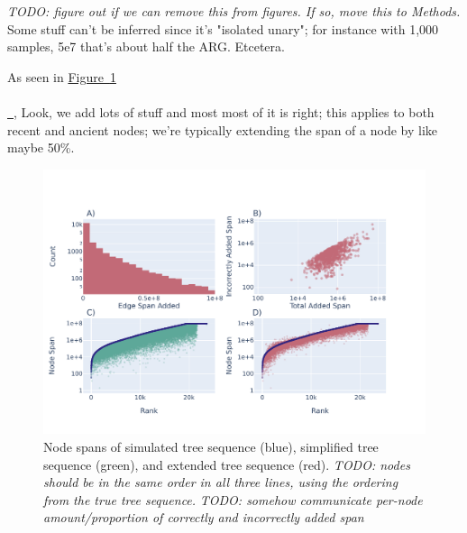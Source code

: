 \documentclass[10pt,twoside,lineno]{gsajnl}
\newcommand{\comment}[1]{{\color{violet} \it #1}}
\newcommand*{\figref}[2][]{%
	\hyperref[{#2}]{%
		Figure~\ref*{#2}%
		\ifx\\#1\\%
		\else
		\,#1%
		\fi
	}%
}
\begin{document}
\comment{TODO: figure out if we can remove this from figures. If so, move this to Methods.}
Some stuff can't be inferred since it's "isolated unary";
for instance with 1,000 samples, 5e7 that's about half the ARG.
Etcetera.

%
%

As seen in \figref{fig:node-spans},
Look, we add lots of stuff
and most most of it is right;
this applies to both recent and ancient nodes;
we're typically extending the span of a node by like maybe 50\%. 

\begin{figure}[bht]
	\includegraphics[width=0.9\linewidth]{newplots_wo_ee/figure-4-2.pdf}
	\caption{
        Node spans of simulated tree sequence (blue), simplified tree sequence (green), and extended tree sequence (red).
        \comment{TODO: nodes should be in the same order in all three lines,
        using the ordering from the true tree sequence.}
        \comment{TODO: somehow communicate per-node amount/proportion of correctly and incorrectly added span}
    }
	\label{fig:node-spans}
\end{figure}
\end{document}
